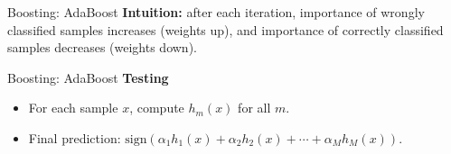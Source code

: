 \documentclass[aspectratio=169,10pt]{beamer}
\begin{document}
\begin{frame}{Boosting: AdaBoost}
  \small
  \textbf{Intuition:} after each iteration, importance of wrongly classified samples increases (weights up), and importance of correctly classified samples decreases (weights down).
\end{frame}

\begin{frame}{Boosting: AdaBoost}
  \textbf{Testing}\\[0.2cm]
  \begin{itemize}
    \item For each sample $x$, compute $h_m(x)$ for all $m$.
    \item Final prediction: \(\mathrm{sign}\!\left(\alpha_1 h_1(x)+\alpha_2 h_2(x)+\cdots+\alpha_M h_M(x)\right)\).
  \end{itemize}
\end{frame}
\end{document}
